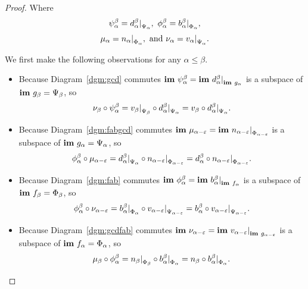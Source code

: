 \begin{proof}
  Where
  \[ \psi_\alpha^\beta = d_\alpha^\beta\mathord{\mid}_{\Psi_\alpha},\ \phi_\alpha^\beta = b_\alpha^\beta\mathord{\mid}_{\Phi_\alpha},\]
  \[ \mu_\alpha = n_\alpha\mathord{\mid}_{\Phi_\alpha},\text{ and } \nu_\alpha = v_\alpha\mathord{\mid}_{\Psi_\alpha}. \]

  We first make the following observations for any $\alpha\leq\beta$.
  \begin{itemize}
    \item Because Diagram~\ref{dgm:gcd} commutes $\mathbf{im}~\psi_\alpha^\beta = \mathbf{im}~d_\alpha^\beta\mathord{\mid}_{\mathbf{im}~g_\alpha}$ is a subspace of $\mathbf{im}~g_\beta = \Psi_\beta$, so
      \[ \nu_\beta\circ\psi_\alpha^\beta = v_\beta\mathord{\mid}_{\Psi_\beta}\circ d_\alpha^\beta\mathord{\mid}_{\Psi_\alpha} = v_\beta\circ d_\alpha^\beta\mathord{\mid}_{\Psi_\alpha}. \]
    \item Because Diagram~\ref{dgm:fabgcd} commutes $\mathbf{im}~\mu_{\alpha-\varepsilon} = \mathbf{im}~n_{\alpha-\varepsilon}\mathord{\mid}_{\Phi_{\alpha-\varepsilon}}$ is a subspace of $\mathbf{im}~g_\alpha = \Psi_\alpha$, so
      \[ \phi_\alpha^\beta\circ\mu_{\alpha-\varepsilon} = d_\alpha^\beta\mathord{\mid}_{\Psi_\alpha}\circ n_{\alpha-\varepsilon}\mathord{\mid}_{\Phi_{\alpha-\varepsilon}} = d_\alpha^\beta\circ n_{\alpha-\varepsilon}\mathord{\mid}_{\Phi_{\alpha-\varepsilon}}.\]
    \item Because Diagram~\ref{dgm:fab} commutes $\mathbf{im}~\phi_\alpha^\beta = \mathbf{im}~b_\alpha^\beta\mathord{\mid}_{\mathbf{im}~f_\alpha}$ is a subspace of $\mathbf{im}~f_\beta = \Phi_\beta$, so
      \[\phi_\alpha^\beta\circ \nu_{\alpha-\varepsilon} = b_\alpha^\beta\mathord{\mid}_{\Phi_\alpha}\circ v_{\alpha-\varepsilon}\mathord{\mid}_{\Psi_{\alpha-\varepsilon}} = b_\alpha^\beta\circ v_{\alpha-\varepsilon}\mathord{\mid}_{\Psi_{\alpha-\varepsilon}}.\]
    \item Because Diagram~\ref{dgm:gcdfab} commutes $\mathbf{im}~\nu_{\alpha-\varepsilon} = \mathbf{im}~v_{\alpha-\varepsilon}\mathord{\mid}_{\mathbf{im}~g_{\alpha-\varepsilon}}$ is a subspace of $\mathbf{im}~f_\alpha = \Phi_\alpha$, so
      \[ \mu_\beta\circ \phi_\alpha^\beta = n_\beta\mathord{\mid}_{\Phi_\beta}\circ b_\alpha^\beta\mathord{\mid}_{\Phi_\alpha} = n_\beta\circ b_\alpha^\beta\mathord{\mid}_{\Phi_\alpha}. \]
  \end{itemize}


\end{proof}
